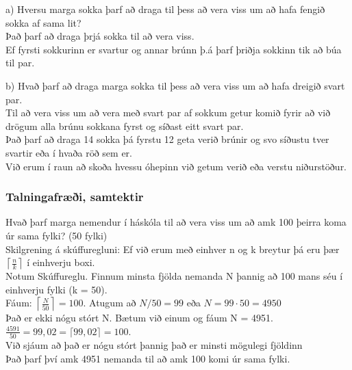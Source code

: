 a) Hversu marga sokka þarf að draga til þess að vera viss um að hafa fengið \hspace*{2.6em}sokka af sama lit?\\
\hspace*{2.6em}Það þarf að draga þrjá sokka til að vera viss.\\
\hspace*{2.6em}Ef fyrsti sokkurinn er svartur og annar brúnn þ.á þarf þriðja sokkinn tik að \hspace*{2.6em}búa til par.\vspace*{0.5em}

b) Hvað þarf að draga marga sokka til þess að vera viss um að hafa dreigið svart \hspace*{2.6em}par.\\
\hspace*{2.6em}Til að vera viss um að vera með svart par af sokkum getur komið fyrir að \hspace*{2.6em}við drögum alla brúnu sokkana fyrst og síðast eitt svart par.\\
\hspace*{2.6em}Það þarf að draga 14 sokka þá fyrstu 12 geta verið brúnir og svo síðustu tver \hspace*{2.6em}svartir eða í hvaða röð sem er.\vspace*{0.5em}\\
Við erum í raun að skoða hvessu óhepinn við getum verið eða verstu niðurstöður.\vspace*{-0.5em}

\subsubsection{Talningafræði, samtektir}
Hvað þarf marga nemendur í háskóla til að vera viss um að amk 100 þeirra koma úr sama fylki? (50 fylki)\vspace*{0.5em}\\
Skilgrening á skúffuregluni: Ef við erum með einhver n og k breytur þá eru þær $\left\lceil \frac{n}{k} \right\rceil$ í einhverju boxi.\vspace*{0.5em}\\
Notum Skúffureglu. Finnum minsta fjölda nemanda N þannig að 100 mans séu í einhverju fylki (k = 50).\vspace*{0.5em}\\
Fáum: $\left\lceil \frac{N}{50} \right\rceil = 100$. Atugum að $N/50 = 99$ eða $N=99\cdot 50 = 4950$\\
Það er ekki nógu stórt N. Bætum við einum og fáum N = 4951.\vspace*{0.5em}\\
$\frac{4591}{50} = 99,02 = \lceil 99,02 \rceil = 100$.\vspace*{0.3em}\\
Við sjáum að það er nógu stórt þannig það er minsti mögulegi fjöldinn\vspace*{0.3em}\\
Það þarf því amk 4951 nemanda til að amk 100 komi úr sama fylki.
\newpage

